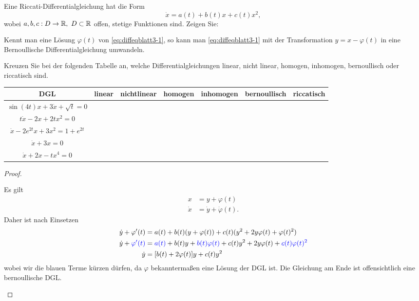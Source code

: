 \begin{Problem}
	\begin{parts}
		\item Eine Riccati-Differentialgleichung hat die Form
			\begin{equation}\label{eq:diffeqblatt3-1}
	\dot{x}=a(t)+b(t)x+c(t)x^2
,\end{equation}
wobei $a,b,c:D\to \mathbb{R},~D\subset \mathbb{R}$ offen, stetige Funktionen sind. Zeigen Sie:

Kennt man eine L\"{o}sung $\varphi(t)$ von \eqref{eq:diffeqblatt3-1}, so kann man \eqref{eq:diffeqblatt3-1} mit der Transformation $y=x-\varphi(t)$ in eine Bernoullische Differentialgleichung umwandeln.
\item Kreuzen Sie bei der folgenden Tabelle an, welche Differentialgleichungen linear, nicht linear, homogen, inhomogen, bernoullisch oder riccatisch sind.

	\begin{tabular}{c|c|c|c|c|c|c}
		DGL & linear & nichtlinear & homogen & inhomogen & bernoullisch & riccatisch \\\hline
		$\sin(4t)x+3\dot{x}+\sqrt{t} =0$ & & & & & & \\\hline
		$t\dot{x}-2x+2tx^2=0$ & & & & & & \\\hline
		$\dot{x}-2e^{2t}x+3x^2=1+e^{2t}$ & & & & & & \\\hline
		$\dot{x}+3x=0$ & & & & & & \\\hline
		$\dot{x}+2x-tx^4=0$ & & & & & & 
	\end{tabular}
\end{parts}
\end{Problem}
\begin{proof}
\begin{parts}
\item Es gilt
	\begin{align*}
		x&=y+\varphi(t)\\
		\dot{x}&=\dot{y}+\dot{\varphi}(t).
	\end{align*}
	Daher ist nach Einsetzen
	\begin{align*}
		\dot{y}+\varphi'(t)&=a(t)+b(t)(y+\varphi(t))+c(t)(y^2+2y\varphi(t)+\varphi(t)^2) \\
		\dot{y}+\textcolor{blue}{\varphi'(t)}&=\textcolor{blue}{a(t)}+b(t)y+\textcolor{blue}{b(t)\varphi(t)}+c(t)y^2+2y\varphi(t)+\textcolor{blue}{c(t)\varphi(t)^2}\\
		\dot{y}&= [b(t)+2\varphi(t)]y + c(t)y^2
	\end{align*}
	wobei wir die blauen Terme k\"{u}rzen d\"{u}rfen, da $\varphi$ bekanntermaßen eine L\"{o}sung der DGL ist. Die Gleichung am Ende ist offensichtlich eine bernoullische DGL.
\item 
\end{parts}	
\end{proof}
